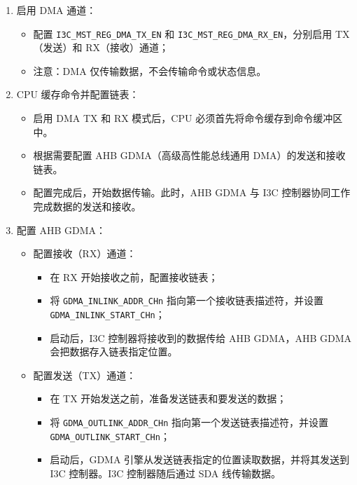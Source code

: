 \documentclass[main\_\_CN.tex]{subfiles}
\begin{document}
\begin{enumerate}
    \item 启用 DMA 通道：
    \begin{itemize}
        \item 配置 \texttt{I3C\_MST\_REG\_DMA\_TX\_EN} 和 \texttt{I3C\_MST\_REG\_DMA\_RX\_EN}，分别启用 TX（发送）和 RX（接收）通道；
        \item 注意：DMA 仅传输数据，不会传输命令或状态信息。
    \end{itemize}

    \item CPU 缓存命令并配置链表：
    \begin{itemize}
        \item 启用 DMA TX 和 RX 模式后，CPU 必须首先将命令缓存到命令缓冲区中。
        \item 根据需要配置 AHB GDMA（高级高性能总线通用 DMA）的发送和接收链表。
        \item 配置完成后，开始数据传输。此时，AHB GDMA 与 I3C 控制器协同工作完成数据的发送和接收。
    \end{itemize}

    \item 配置 AHB GDMA：
    \begin{itemize}
        \item 配置接收（RX）通道：
        \begin{itemize}
            \item 在 RX 开始接收之前，配置接收链表；
            \item 将 \texttt{GDMA\_INLINK\_ADDR\_CHn} 指向第一个接收链表描述符，并设置 \texttt{GDMA\_INLINK\_START\_CHn}；
            \item 启动后，I3C 控制器将接收到的数据传给 AHB GDMA，AHB GDMA 会把数据存入链表指定位置。
        \end{itemize}

        \item 配置发送（TX）通道：
        \begin{itemize}
        \item 在 TX 开始发送之前，准备发送链表和要发送的数据；
        \item 将 \texttt{GDMA\_OUTLINK\_ADDR\_CHn} 指向第一个发送链表描述符，并设置 \texttt{GDMA\_OUTLINK\_START\_CHn}；
        \item 启动后，GDMA 引擎从发送链表指定的位置读取数据，并将其发送到 I3C 控制器。I3C 控制器随后通过 SDA 线传输数据。
        \end{itemize}
    \end{itemize}


\end{enumerate}
\end{document}
